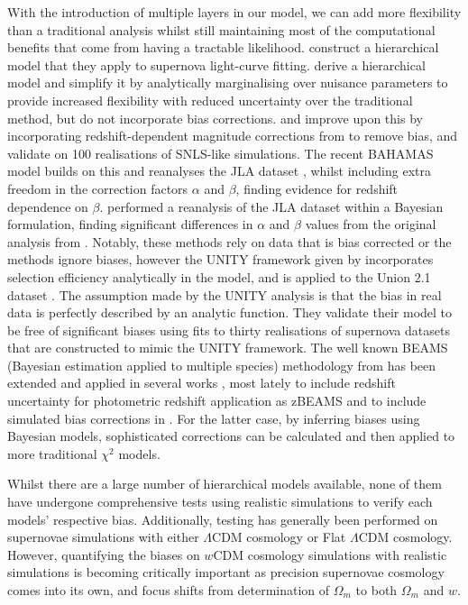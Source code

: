 \documentclass[twocolumn,trackchanges,tighten]{aastex62}
\begin{document}
With the introduction of multiple layers in our model, we can add more flexibility than a traditional analysis whilst still maintaining most of the computational benefits that come from having a tractable likelihood. \citet{Mandel2009, Mandel2011a, Mandel2017} construct a hierarchical model that they apply to supernova light-curve fitting. \citet{March2011} derive a hierarchical model and simplify it by analytically marginalising over nuisance parameters to provide increased flexibility with reduced uncertainty over the traditional method, but do not incorporate bias corrections. \citet{March2014} and \citet{Karpenka2015} improve upon this by incorporating redshift-dependent magnitude corrections from \citet{Perrett2010} to remove bias, and validate on 100 realisations of SNLS-like simulations. The recent BAHAMAS model \citep{Shariff2016} builds on this and reanalyses the JLA dataset \citep[using redshift dependent bias corrections from][]{Betoule2014}, whilst including extra freedom in the correction factors $\alpha$ and $\beta$, finding evidence for redshift dependence on $\beta$. \citet{Ma2016} performed a reanalysis of the JLA dataset within a Bayesian formulation, finding significant differences in $\alpha$ and $\beta$ values from the original analysis from \citet{Betoule2014}. Notably, these methods rely on data that is bias corrected or the methods ignore biases, however the UNITY framework given by \citet{Rubin2015} incorporates selection efficiency analytically in the model, and is applied to the Union 2.1 dataset \citep{Suzuki2012}. The assumption made by the UNITY analysis is that the bias in real data is perfectly described by an analytic function. They validate their  model to be free of significant biases using fits to thirty realisations of supernova datasets that are constructed to mimic the UNITY framework. The well known BEAMS (Bayesian estimation applied to multiple species) methodology from \citet{Kunz2007} has been extended and applied in several works \citep{Hlozek2012}, most lately to include redshift uncertainty for photometric redshift application as zBEAMS \citep{Roberts2017} and to include simulated bias corrections in \citet{Kessler2017}. For the latter case, by inferring biases using Bayesian models, sophisticated corrections can be calculated and then applied to more traditional $\chi^2$ models.


Whilst there are a large number of hierarchical models available, none of them have undergone comprehensive tests using realistic simulations to verify each models' respective bias. Additionally, testing has generally been performed on supernovae simulations with either $\Lambda$CDM cosmology or Flat $\Lambda$CDM cosmology. However, quantifying the biases on $w$CDM cosmology simulations with realistic simulations is becoming critically important as precision supernovae cosmology comes into its own, and focus shifts from determination of $\Omega_m$ to both $\Omega_m$ and $w$.
\end{document}
